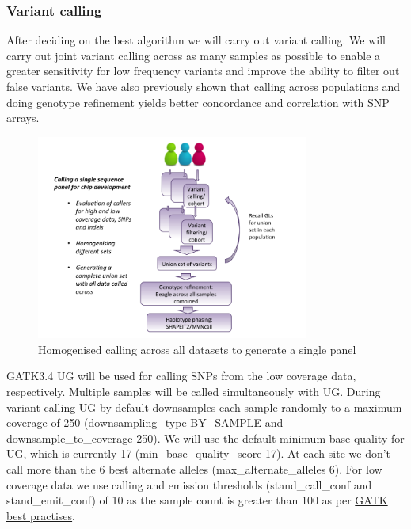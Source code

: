 \subsubsection{Variant calling}
After deciding on the best algorithm we will carry out variant calling. We will carry out joint variant calling across as many samples as possible to enable a greater sensitivity for low frequency variants and improve the ability to filter out false variants. We have also previously shown that calling across populations and doing genotype refinement yields better concordance and correlation with SNP arrays.

\begin{figure}[!htbp]
\centering
\includegraphics[width=0.8\textwidth]{ADRP/figures/calling}
\caption{Homogenised calling across all datasets to generate a single panel}
\label{fig:calling}
\end{figure}
GATK3.4 \gls{UG} will be used for calling SNPs from the low coverage data, respectively. Multiple samples will be called simultaneously with \gls{UG}. During variant calling \gls{UG} by default downsamples each sample randomly to a maximum coverage of 250 (\-\-downsampling\_type BY\_SAMPLE and \-\-downsample\_to\_coverage 250). We will use the default minimum base quality for UG, which is currently 17 (\-\-min\_base\_quality\_score 17). %
At each site we don't call more than the 6 best alternate alleles (\-\-max\_alternate\_alleles 6).
For low coverage data we use calling and emission thresholds (\-stand\_call\_conf and \-stand\_emit\_conf) of 10 as the sample count is greater than 100 as per \href{https://www.broadinstitute.org/gatk/guide/pdfdocs/GATK_GuideBook_2.7-4.pdf}{GATK best practises}. %

